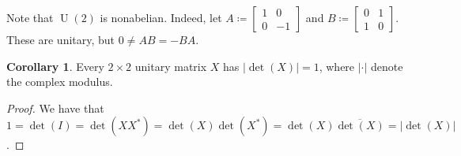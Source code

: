\documentclass[10pt,letterpaper,cm]{nupset}
\theoremstyle{definition}
\theoremstyle{theorem}
\newtheorem{cor}[definition]{Corollary}
\theoremstyle{remark}
\newcommand{\1}{\mathbf{1}}
\newcommand{\0}{\vec {0}}
\DeclareMathOperator{\U}{U}
\begin{document}
\smallskip

Note that
$\U(2)$ is nonabelian. Indeed, 
let $A\coloneqq\begin{bmatrix} 1 & 0 \\  0 & -1\end{bmatrix}$ and $B\coloneqq\begin{bmatrix} 0 & 1 \\  1 & 0\end{bmatrix}$. These are unitary, but  $0\ne AB={-BA}$.


\begin{cor}\label{unitnorm}
Every $2\times 2$ unitary matrix $X$ has $\left\lvert{\det(X)}\right\rvert=1$, where $\left\lvert{\cdot}\right\rvert$ denote the complex modulus.   
\end{cor}

\begin{proof}
We have that $1=\det(I)=\det(XX^\ast)= \det(X)\det(X^\ast)=\det(X)\overline{\det(X)}=\left\lvert{\det(X)}\right\rvert$.
\end{proof}

\medskip
\end{document}
